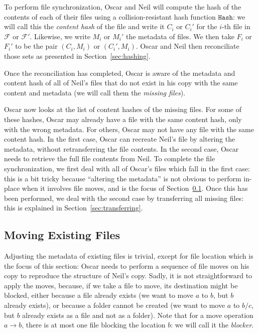 \documentclass{llncs}
\newcommand{\Files}{\mathcal{F}}
\newcommand{\Hash}{\ensuremath{\mathtt{Hash}}}
\begin{document}
To perform file synchronization, Oscar and Neil will compute the hash of the
contents of each of their files using a collision-resistant hash function
$\Hash$: we will call this the \emph{content hash} of the file and write it
$C_i$ or $C_i'$ for the $i$-th file in $\Files$ or $\Files'$. Likewise, we
write $M_i$ or $M_i'$ the metadata of files. We then take $F_i$ or $F_i'$ to be
the pair $(C_i, M_i)$ or $(C_i', M_i)$. Oscar and Neil then reconciliate those
sets as presented in Section~\ref{sec:hashing}.

Once the reconciliation has completed, Oscar is aware of the metadata and
content hash of all of Neil's files that do not exist in his copy with the same
content and metadata (we will call them the \emph{missing files}).

Oscar now looks at the list of content hashes of the missing files. For some of
these hashes, Oscar may already have a file with the same content hash, only
with the wrong metadata. For others, Oscar may not have any file with the same
content hash. In the first case, Oscar can recreate Neil's file by altering the
metadata, without retransferring the file contents. In the second case, Oscar
needs to retrieve the full file contents from Neil. To complete the file
synchronization, we first deal with all of Oscar's files which fall in the first
case: this is a bit tricky because ``altering the metadata'' is not obvious to
perform in-place when it involves file moves, and is the focus of
Section~\ref{sec:moving}. Once this has been performed, we deal with the second case by transferring all missing
files: this is explained in Section~\ref{sec:transferring}.

\subsection{Moving Existing Files}
\label{sec:moving}

Adjusting the metadata of existing files is trivial, except for file location which is the focus of this section: Oscar needs to perform a sequence of file moves on his copy to reproduce the structure of Neil's copy. Sadly, it is not straightforward to apply the moves, because, if we take a file to move, its destination might be blocked, either because a file already exists (we want to move $a$ to $b$, but $b$ already exists), or because a folder cannot be created (we want to move $a$ to $b/c$, but $b$ already exists as a file and not as a folder). Note that for a move operation $a \rightarrow b$, there is at most one file blocking the location $b$: we will call it the \textit{blocker}.
\end{document}
